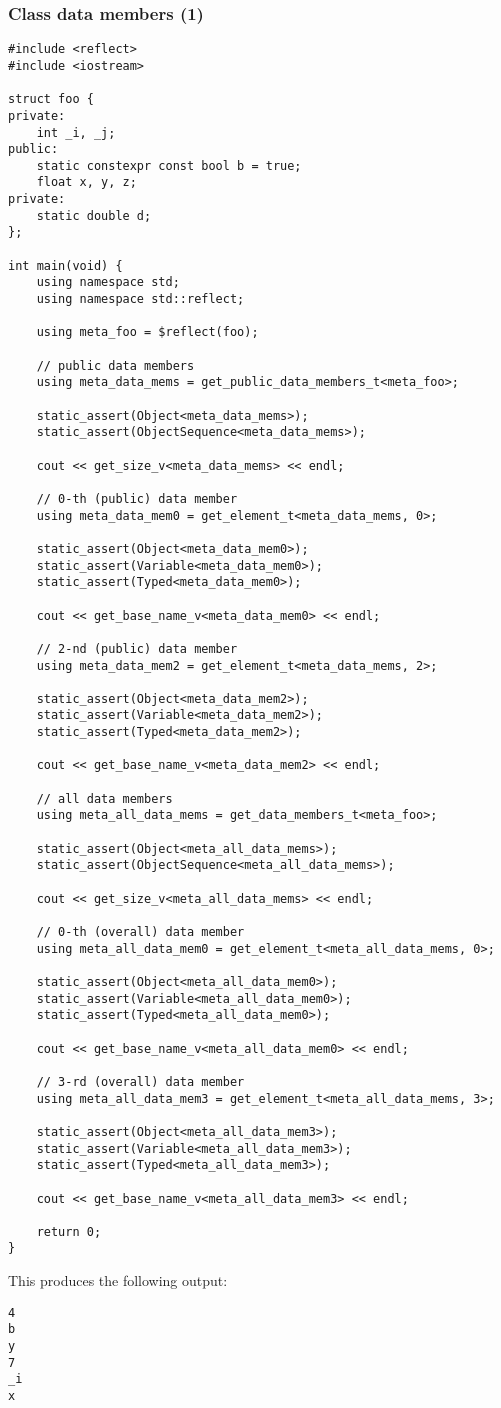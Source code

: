 \subsubsection{Class data members (1)}

\begin{verbatim}
#include <reflect>
#include <iostream>

struct foo {
private:
	int _i, _j;
public:
	static constexpr const bool b = true;
	float x, y, z;
private:
	static double d;
};

int main(void) {
	using namespace std;
	using namespace std::reflect;

	using meta_foo = $reflect(foo);

	// public data members
	using meta_data_mems = get_public_data_members_t<meta_foo>;

	static_assert(Object<meta_data_mems>);
	static_assert(ObjectSequence<meta_data_mems>);

	cout << get_size_v<meta_data_mems> << endl;

	// 0-th (public) data member
	using meta_data_mem0 = get_element_t<meta_data_mems, 0>;

	static_assert(Object<meta_data_mem0>);
	static_assert(Variable<meta_data_mem0>);
	static_assert(Typed<meta_data_mem0>);

	cout << get_base_name_v<meta_data_mem0> << endl;

	// 2-nd (public) data member
	using meta_data_mem2 = get_element_t<meta_data_mems, 2>;

	static_assert(Object<meta_data_mem2>);
	static_assert(Variable<meta_data_mem2>);
	static_assert(Typed<meta_data_mem2>);

	cout << get_base_name_v<meta_data_mem2> << endl;

	// all data members
	using meta_all_data_mems = get_data_members_t<meta_foo>;

	static_assert(Object<meta_all_data_mems>);
	static_assert(ObjectSequence<meta_all_data_mems>);

	cout << get_size_v<meta_all_data_mems> << endl;

	// 0-th (overall) data member
	using meta_all_data_mem0 = get_element_t<meta_all_data_mems, 0>;

	static_assert(Object<meta_all_data_mem0>);
	static_assert(Variable<meta_all_data_mem0>);
	static_assert(Typed<meta_all_data_mem0>);

	cout << get_base_name_v<meta_all_data_mem0> << endl;

	// 3-rd (overall) data member
	using meta_all_data_mem3 = get_element_t<meta_all_data_mems, 3>;

	static_assert(Object<meta_all_data_mem3>);
	static_assert(Variable<meta_all_data_mem3>);
	static_assert(Typed<meta_all_data_mem3>);

	cout << get_base_name_v<meta_all_data_mem3> << endl;

	return 0;
}

\end{verbatim}

This produces the following output:

\begin{verbatim}
4
b
y
7
_i
x
\end{verbatim}

